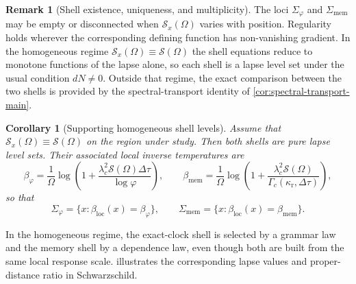 \documentclass[11pt]{article}
\newtheorem{corollary}[theorem]{Corollary}
\theoremstyle{definition}
\newtheorem{remark}[theorem]{Remark}
\begin{document}
\begin{remark}[Shell existence, uniqueness, and multiplicity]\label{rem:shell-existence}
The loci $\Sigma_\varphi$ and $\Sigma_{\mathrm{mem}}$ may be empty or disconnected when $\mathcal S_x(\Omega)$ varies with position. Regularity holds wherever the corresponding defining function has non-vanishing gradient. In the homogeneous regime $\mathcal S_x(\Omega)\equiv\mathcal S(\Omega)$ the shell equations reduce to monotone functions of the lapse alone, so each shell is a lapse level set under the usual condition $dN\neq0$. Outside that regime, the exact comparison between the two shells is provided by the spectral-transport identity of \cref{cor:spectral-transport-main}.
\end{remark}

\begin{corollary}[Supporting homogeneous shell levels]\label{cor:homogeneous-main}
Assume that $\mathcal S_x(\Omega)\equiv\mathcal S(\Omega)$ on the region under study. Then both shells are pure lapse level sets. Their associated local inverse temperatures are
\begin{equation}\label{eq:betaphi-betamem-main}
\beta_{\varphi}=
\frac{1}{\Omega}
\log\!\left(1+\frac{\lambda_c^2\mathcal S(\Omega)\Delta\tau}{\log\varphi}\right),
\qquad
\beta_{\mathrm{mem}}=
\frac{1}{\Omega}
\log\!\left(1+\frac{\lambda_c^2\mathcal S(\Omega)}
{\Gamma_c(\kappa_{\mathrm r},\Delta\tau)}\right),
\end{equation}
so that
\begin{equation}\label{eq:lapse-level-main}
\Sigma_{\varphi}=\{x:\beta_{\mathrm{loc}}(x)=\beta_{\varphi}\},
\qquad
\Sigma_{\mathrm{mem}}=\{x:\beta_{\mathrm{loc}}(x)=\beta_{\mathrm{mem}}\}.
\end{equation}
\end{corollary}

In the homogeneous regime, the exact-clock shell is selected by a grammar law and the memory shell by a dependence law, even though both are built from the same local response scale.  illustrates the corresponding lapse values and proper-distance ratio in Schwarzschild.
\end{document}

